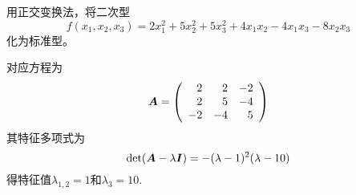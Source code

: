 \begin{frame}
  
  \begin{li}{\blue{$\bigstar\bigstar\bigstar\bigstar\bigstar$}}
    用正交变换法，将二次型
    $$
    f(x_1,x_2,x_3)=2x_1^2+5x_2^2+5x_3^2+4x_1x_2-4x_1x_3-8x_2x_3
    $$
    化为标准型。
  \end{li}
  \pause
  对应方程为
  $$
  \boldsymbol{A}=\left(
    \begin{array}{rrr}
      2&2&-2\\
      2&5&-4\\
      -2&-4&5
    \end{array}
  \right)
  $$
  \pause
  其特征多项式为
  $$
  \mathrm{det}(\boldsymbol{A}-\lambda\boldsymbol{I})=-(\lambda-1)^2(\lambda-10)
  $$
  得特征值$\lambda_{1,2}=1$和$\lambda_3=10$.
  
\end{frame}


